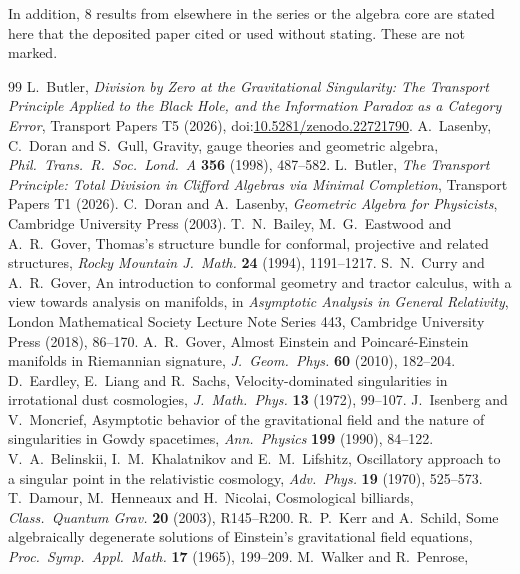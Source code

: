 \documentclass[11pt]{article}
\theoremstyle{definition}
\theoremstyle{plain}
\begin{document}
\noindent In addition, 8 results from elsewhere in the series or the algebra core are stated here that the deposited paper cited or used without stating. These are not marked.
\begin{thebibliography}{99}
 L.~Butler,
\emph{Division by Zero at the Gravitational Singularity: The Transport Principle Applied to the Black Hole, and the Information Paradox as a Category Error},
Transport Papers T5 (2026), doi:\href{https://doi.org/10.5281/zenodo.22721790}{10.5281/zenodo.22721790}.
 A.~Lasenby, C.~Doran and S.~Gull,
Gravity, gauge theories and geometric algebra,
\emph{Phil.\ Trans.\ R.\ Soc.\ Lond.\ A} \textbf{356} (1998), 487--582.
 L.~Butler,
\emph{The Transport Principle: Total Division in Clifford Algebras via Minimal Completion},
Transport Papers T1 (2026).
 C.~Doran and A.~Lasenby,
\emph{Geometric Algebra for Physicists},
Cambridge University Press (2003).
 T.~N.~Bailey, M.~G.~Eastwood and A.~R.~Gover,
Thomas's structure bundle for conformal, projective and related structures,
\emph{Rocky Mountain J.\ Math.} \textbf{24} (1994), 1191--1217.
 S.~N.~Curry and A.~R.~Gover,
An introduction to conformal geometry and tractor calculus, with a view towards analysis on manifolds,
in \emph{Asymptotic Analysis in General Relativity},
London Mathematical Society Lecture Note Series 443, Cambridge University Press (2018), 86--170.
 A.~R.~Gover,
Almost Einstein and Poincar\'e-Einstein manifolds in Riemannian signature,
\emph{J.\ Geom.\ Phys.} \textbf{60} (2010), 182--204.
 D.~Eardley, E.~Liang and R.~Sachs,
Velocity-dominated singularities in irrotational dust cosmologies,
\emph{J.\ Math.\ Phys.} \textbf{13} (1972), 99--107.
 J.~Isenberg and V.~Moncrief,
Asymptotic behavior of the gravitational field and the nature of singularities in Gowdy spacetimes,
\emph{Ann.\ Physics} \textbf{199} (1990), 84--122.
 V.~A.~Belinskii, I.~M.~Khalatnikov and E.~M.~Lifshitz,
Oscillatory approach to a singular point in the relativistic cosmology,
\emph{Adv.\ Phys.} \textbf{19} (1970), 525--573.
 T.~Damour, M.~Henneaux and H.~Nicolai,
Cosmological billiards,
\emph{Class.\ Quantum Grav.} \textbf{20} (2003), R145--R200.
 R.~P.~Kerr and A.~Schild,
Some algebraically degenerate solutions of Einstein's gravitational field equations,
\emph{Proc.\ Symp.\ Appl.\ Math.} \textbf{17} (1965), 199--209.
 M.~Walker and R.~Penrose,

\end{thebibliography}
\end{document}
